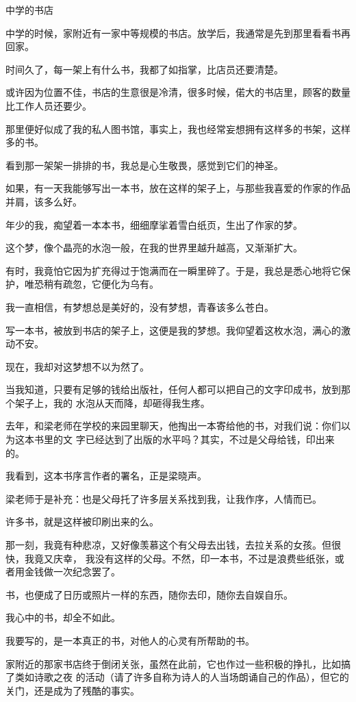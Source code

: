 \documentclass[12pt,a4paper]{article}
\newcommand{\subpart}[1]{
	\begingroup \par
	\vspace{1ex} \centering #1
	\par \endgroup
}
\begin{document}
		\subpart{中学的书店}

		中学的时候，家附近有一家中等规模的书店。放学后，我通常是先到那里看看书再回家。\par
		时间久了，每一架上有什么书，我都了如指掌，比店员还要清楚。\par
		或许因为位置不佳，书店的生意很是冷清，很多时候，偌大的书店里，顾客的数量比工作人员还要少。\par
		那里便好似成了我的私人图书馆，事实上，我也经常妄想拥有这样多的书架，这样多的书。\par
		看到那一架架一排排的书，我总是心生敬畏，感觉到它们的神圣。

		如果，有一天我能够写出一本书，放在这样的架子上，与那些我喜爱的作家的作品并肩，该多么好。

		年少的我，痴望着一本本书，细细摩挲着雪白纸页，生出了作家的梦。\par
		这个梦，像个晶亮的水泡一般，在我的世界里越升越高，又渐渐扩大。\par
		有时，我竟怕它因为扩充得过于饱满而在一瞬里碎了。于是，我总是悉心地将它保护，唯恐稍有疏忽，它便化为乌有。\par
		我一直相信，有梦想总是美好的，没有梦想，青春该多么苍白。

		写一本书，被放到书店的架子上，这便是我的梦想。我仰望着这枚水泡，满心的激动不安。\par
		现在，我却对这梦想不以为然了。

		当我知道，只要有足够的钱给出版社，任何人都可以把自己的文字印成书，放到那个架子上，我的
	水泡从天而降，却砸得我生疼。

		去年，和梁老师在学校的来园里聊天，他掏出一本寄给他的书，对我们说：你们以为这本书里的文
	字已经达到了出版的水平吗？其实，不过是父母给钱，印出来的。

		我看到，这本书序言作者的署名，正是梁晓声。\par
		梁老师于是补充：也是父母托了许多层关系找到我，让我作序，人情而已。

		许多书，就是这样被印刷出来的么。

		那一刻，我竟有种悲凉，又好像羡慕这个有父母去出钱，去拉关系的女孩。但很快，我竟又庆幸，
	我没有这样的父母。不然，印一本书，不过是浪费些纸张，或者用金钱做一次纪念罢了。

		书，也便成了日历或照片一样的东西，随你去印，随你去自娱自乐。\par
		我心中的书，却全不如此。\par
		我要写的，是一本真正的书，对他人的心灵有所帮助的书。

		家附近的那家书店终于倒闭关张，虽然在此前，它也作过一些积极的挣扎，比如搞了类如诗歌之夜
	的活动（请了许多自称为诗人的人当场朗诵自己的作品），但它的关门，还是成为了残酷的事实。
\end{document}

